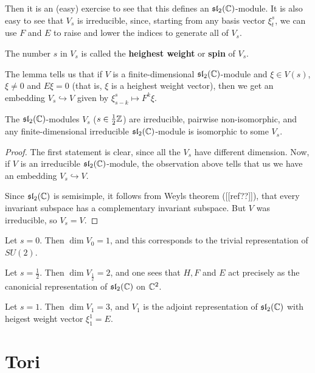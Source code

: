 \documentclass[11pt, english]{article}
\begin{document}
Then it is an (easy) exercise to see that this defines an $\mathfrak{sl}_2(\mathbb{C})$-module. It is also easy to see that $V_s$ is irreducible, since, starting from any basis vector $\xi_t^s$, we can use $F$ and $E$ to raise and lower the indices to generate all of $V_s$.

The number $s$ in $V_s$ is called the \textbf{heighest weight} or \textbf{spin} of $V_s$.

The lemma tells us that if $V$ is a finite-dimensional $\mathfrak{sl}_2(\mathbb{C})$-module and $\xi \in V(s)$, $\xi \neq 0$ and $E \xi = 0$ (that is, $\xi$ is a heighest weight vector), then we get an embedding $V_s \hookrightarrow V$ given by $\xi_{s-k}^s \mapsto F^k \xi$.

\begin{thm}
 The $\mathfrak{sl}_2(\mathbb{C})$-modules $V_s$ ($s \in  \frac 12 \mathbb{Z}$) are irreducible, pairwise non-isomorphic, and any finite-dimensional irreducible $\mathfrak{sl}_2(\mathbb{C})$-module is isomorphic to some $V_s$.
\end{thm}
\begin{proof}
The first statement is clear, since all the $V_s$ have different dimension. Now, if $V$ is an irreducible $\mathfrak{sl}_2(\mathbb{C})$-module, the observation above tells that us we have an embedding $V_s \hookrightarrow V$.

Since $\mathfrak{sl}_2(\mathbb{C})$ is semisimple, it follows from Weyls theorem ([[ref??]]), that every invariant subspace has a complementary invariant subspace. But $V$ was irreducible, so $V_s=V$.
\end{proof}

\begin{example}
  Let $s=0$. Then $\dim V_0 = 1$, and this corresponds to the trivial representation of $SU(2)$. 
\end{example}

\begin{example}
 Let $s=\frac 12$. Then $\dim V_{\frac 12} = 2$, and one sees that $H,F$ and $E$ act precisely as the canonicial representation of $\mathfrak{sl}_2(\mathbb{C})$ on $\mathbb{C}^2$. 
\end{example}

\begin{example}
Let $s=1$. Then $\dim V_1 = 3$, and $V_1$ is the adjoint representation of $\mathfrak{sl}_2(\mathbb{C})$ with heigest weight vector $\xi_1^1 = E$. 
\end{example}



\newpage
\section{Tori}
\end{document}
